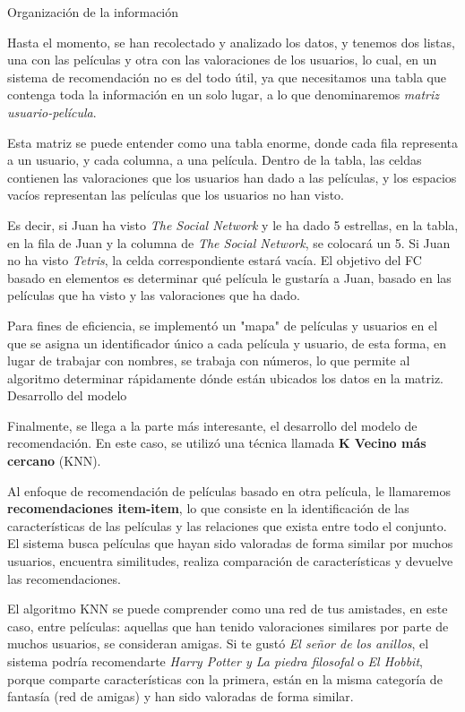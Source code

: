 \documentclass[letterpaper,10pt,final,hyphenatedtitles]{papertexKS}
\begin{document}
\begin{news}{2}
	\noindent\textcolor{color}{\Large{Organización de la información}}

	Hasta el momento, se han recolectado y analizado los datos, y tenemos dos listas, una con las películas y otra con las valoraciones de los usuarios, lo cual, en un sistema de recomendación no es del todo útil, ya que necesitamos una tabla que contenga toda la información en un solo lugar, a lo que denominaremos \textit{matriz usuario-película}.

	Esta matriz se puede entender como una tabla enorme, donde cada fila representa a un usuario, y cada columna, a una película. Dentro de la tabla, las celdas contienen las valoraciones que los usuarios han dado a las películas, y los espacios vacíos representan las películas que los usuarios no han visto.

	Es decir, si Juan ha visto \textit{The Social Network} y le ha dado 5 estrellas, en la tabla, en la fila de Juan y la columna de \textit{The Social Network}, se colocará un 5. Si Juan no ha visto \textit{Tetris}, la celda correspondiente estará vacía. El objetivo del FC basado en elementos es determinar qué película le gustaría a Juan, basado en las películas que ha visto y las valoraciones que ha dado.

	Para fines de eficiencia, se implementó un "mapa" de películas y usuarios en el que se asigna un identificador único a cada película y usuario, de esta forma, en lugar de trabajar con nombres, se trabaja con números, lo que permite al algoritmo determinar rápidamente dónde están ubicados los datos en la matriz.
	\\ 

    \noindent\textcolor{color}{\Large{Desarrollo del modelo}}

    Finalmente, se llega a la parte más interesante, el desarrollo del modelo de recomendación. En este caso, se utilizó una técnica llamada \textbf{K Vecino más cercano} (KNN). 

	Al enfoque de recomendación de películas basado en otra película, le llamaremos \textbf{recomendaciones item-item}, lo que consiste en la identificación de las características de las películas y las relaciones que exista entre todo el conjunto. El sistema busca películas que hayan sido valoradas de forma similar por muchos usuarios, encuentra similitudes, realiza comparación de características y devuelve las recomendaciones.

	El algoritmo KNN se puede comprender como una red de tus amistades, en este caso, entre películas: aquellas que han tenido valoraciones similares por parte de muchos usuarios, se consideran amigas. Si te gustó \textit{El señor de los anillos}, el sistema podría recomendarte \textit{Harry Potter y La piedra filosofal} o \textit{El Hobbit}, porque comparte características con la primera, están en la misma categoría de fantasía (red de amigas) y han sido valoradas de forma similar.


\end{news}
\end{document}
